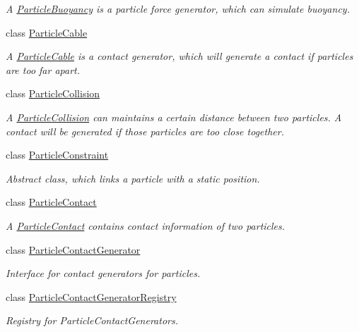 \begin{DoxyCompactItemize}
\begin{DoxyCompactList}\small\item\em A \mbox{\hyperlink{classr3_1_1_particle_buoyancy}{Particle\+Buoyancy}} is a particle force generator, which can simulate buoyancy. \end{DoxyCompactList}\item 
class \mbox{\hyperlink{classr3_1_1_particle_cable}{Particle\+Cable}}
\begin{DoxyCompactList}\small\item\em A \mbox{\hyperlink{classr3_1_1_particle_cable}{Particle\+Cable}} is a contact generator, which will generate a contact if particles are too far apart. \end{DoxyCompactList}\item 
class \mbox{\hyperlink{classr3_1_1_particle_collision}{Particle\+Collision}}
\begin{DoxyCompactList}\small\item\em A \mbox{\hyperlink{classr3_1_1_particle_collision}{Particle\+Collision}} can maintains a certain distance between two particles. A contact will be generated if those particles are too close together. \end{DoxyCompactList}\item 
class \mbox{\hyperlink{classr3_1_1_particle_constraint}{Particle\+Constraint}}
\begin{DoxyCompactList}\small\item\em Abstract class, which links a particle with a static position. \end{DoxyCompactList}\item 
class \mbox{\hyperlink{classr3_1_1_particle_contact}{Particle\+Contact}}
\begin{DoxyCompactList}\small\item\em A \mbox{\hyperlink{classr3_1_1_particle_contact}{Particle\+Contact}} contains contact information of two particles. \end{DoxyCompactList}\item 
class \mbox{\hyperlink{classr3_1_1_particle_contact_generator}{Particle\+Contact\+Generator}}
\begin{DoxyCompactList}\small\item\em Interface for contact generators for particles. \end{DoxyCompactList}\item 
class \mbox{\hyperlink{classr3_1_1_particle_contact_generator_registry}{Particle\+Contact\+Generator\+Registry}}
\begin{DoxyCompactList}\small\item\em Registry for Particle\+Contact\+Generators. \end{DoxyCompactList}\item 

\end{DoxyCompactItemize}
